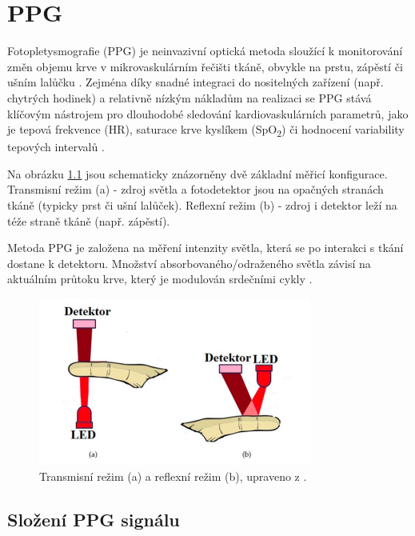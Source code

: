 \chapter{\acl{PPG}}

Fotopletysmografie (\acs{PPG}) je neinvazivní optická metoda sloužící k monitorování změn objemu krve v mikrovaskulárním řečišti tkáně, obvykle na prstu, zápěstí či ušním lalůčku \cite{Park2022}.
Zejména díky snadné integraci do nositelných zařízení (např. chytrých hodinek) a relativně nízkým nákladům na realizaci se \acs{PPG} stává klíčovým nástrojem pro dlouhodobé sledování kardiovaskulárních parametrů,
jako je tepová frekvence (HR), saturace krve kyslíkem (SpO\textsubscript{2}) či hodnocení variability tepových intervalů \cite{Orphanidou2018}.

Na obrázku \ref{fig:snimaniPPG} jsou schematicky znázorněny dvě základní měřicí konfigurace.
Transmisní režim (a) - zdroj světla a fotodetektor jsou na opačných stranách tkáně (typicky prst či ušní lalůček).
Reflexní režim (b) - zdroj i detektor leží na téže straně tkáně (např. zápěstí).

Metoda \acs{PPG} je založena na měření intenzity světla, která se po interakci s tkání dostane k detektoru.
Množství absorbovaného/odraženého světla závisí na aktuálním průtoku krve, který je modulován srdečními cykly \cite{Park2022}.

\begin{figure}[h]
	\centering
	\includegraphics[width=0.8\textwidth]{./obrazky/snimaniPPG.png}
	\caption[Snímání PPG signálu]{Transmisní režim (a) a reflexní režim (b), upraveno z \cite{ENIKÖ}.}
	\label{fig:snimaniPPG}
\end{figure}

\section{Složení \acs{PPG} signálu}

